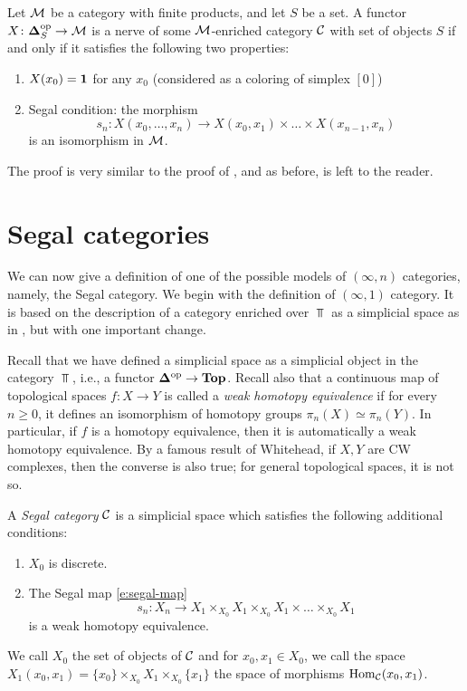 \begin{theorem}\label{t:nerve-enriched}
  Let $\mathcal{M}$ be a category with finite products, and let $S$ be a set. A
  functor $X\colon \mathbf{\Delta}_S^{\mathrm{op}}\to \mathcal{M}$ is a nerve of some $\mathcal{M}$-enriched
  category $\mathcal{C}$ with set of objects $S$ if and only if it satisfies the
  following two properties:
  \begin{enumerate}
    \item $X(x_0)=\mathbf{1}$ for any $x_0$ \textup{(}considered as a coloring of simplex
      $[0]$\textup{)}
    \item Segal condition: the morphism
    $$
      s_n\colon X(x_0, \dots, x_n)\to
        X(x_0, x_1)\times \dots\times X(x_{n-1}, x_n)
    $$
    is an isomorphism in $\mathcal{M}$.
  \end{enumerate}
\end{theorem}

The proof is very similar to the proof of , and as before, is
left to the reader.



\section{Segal categories}\label{s:segal-cat}
We can now give a definition of one of the possible models of $(\infty, n)$
categories, namely, the Segal category. We begin with the definition of
$(\infty, 1)$ category. It is based on the description of a category enriched
over $\Top$ as a simplicial space as in , but with one
important change.

Recall that we have defined a simplicial space as a simplicial object in the
category $\Top$, i.e., a functor $\mathbf{\Delta}^{\mathrm{op}}\to \mathbf{Top}$. Recall also that a
continuous map of topological spaces $f\colon X\to Y$ is called a \emph{weak
homotopy equivalence} if for every $n\ge0$, it
defines an isomorphism of homotopy groups $\pi_n(X)\simeq \pi_n(Y)$. In
particular, if $f$ is a homotopy equivalence, then it is automatically a weak
homotopy equivalence. By a famous result of Whitehead, if $X,Y$ are CW
complexes, then the converse is also true; for general topological spaces, it is
not so.

\begin{definition}\label{d:segal-cat}
  A \emph{Segal category} $\mathcal{C}$ is a simplicial space which satisfies the
  following additional conditions:
  \begin{enumerate}
    \item $X_0$ is discrete.
    \item The Segal map \eqref{e:segal-map}
      $$
        s_n \colon X_n \to
        X_1\times_{X_0} X_1\times_{X_0} X_1 \times\dots \times_{X_0} X_1
      $$
      is a weak homotopy equivalence.
  \end{enumerate}
  We call $X_0$ the set of objects of $\mathcal{C}$ and for $x_0, x_1\in X_0$, we call
  the space $X_1(x_0, x_1) = \{x_0\}\times_{X_0} X_1 \times_{X_0}\{x_1\}$ the space of
  morphisms $\operatorname{Hom}_{\mathcal{C}}(x_0, x_1)$.
\end{definition}

